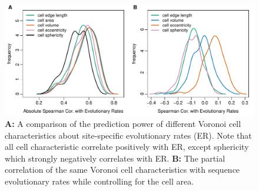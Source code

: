 \documentclass[11pt]{article}
\begin{document}
    \begin{figure}[tbh]
        \begin{center}
        \includegraphics[width=7in]{best_voronoi_predictors_of_ER_screen.pdf}
        \end{center}
        \caption{{\bf A:} A comparison of the prediction power of different Voronoi cell characteristics about site-specific evolutionary rates (ER). Note that all cell characteristic correlate positively with ER, except sphericity which strongly negatively correlates with ER. {\bf B:} The partial correlation of the same Voronoi cell characteristics with sequence evolutionary rates while controlling for the cell area.}
        \label{fig:voronoi_ER}
    \end{figure}
\end{document}
